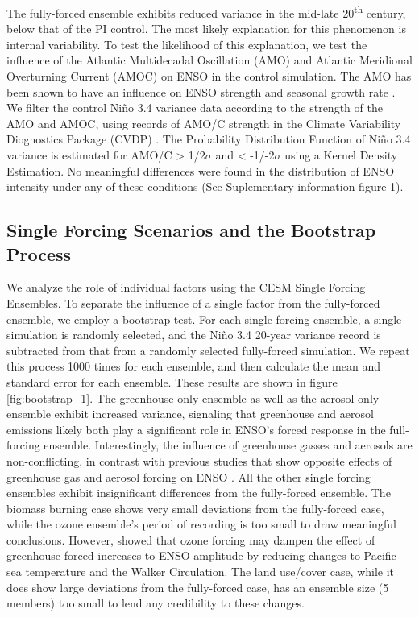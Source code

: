 \documentclass[11pt]{article}
\begin{document}
The fully-forced ensemble exhibits reduced variance in the mid-late 20\textsuperscript{th} century, below that of the PI control. The most likely explanation for this phenomenon is internal variability. To test the likelihood of this explanation, we test the influence of the Atlantic Multidecadal Oscillation (AMO) and Atlantic Meridional Overturning Current (AMOC) on ENSO in the control simulation. The AMO has been shown to have an influence on ENSO strength and seasonal growth rate \citep{levine2017impact}. We filter the control Niño 3.4 variance data according to the strength of the AMO and AMOC, using records of AMO/C strength in the Climate Variability Diognostics Package (CVDP) \citep{phillips2014evaluating}. The Probability Distribution Function of Niño 3.4 variance is estimated for AMO/C > 1/2\(\sigma\) and < -1/-2\(\sigma\) using a Kernel Density Estimation. No meaningful differences were found in the distribution of ENSO intensity under any of these conditions (See Suplementary information figure 1).

\subsection{Single Forcing Scenarios and the Bootstrap Process}
\label{sec:orgec2797d}
We analyze the role of individual factors using the CESM Single Forcing Ensembles. To separate the influence of a single factor from the fully-forced ensemble, we employ a bootstrap test. For each single-forcing ensemble, a single simulation is randomly selected, and the Niño 3.4 20-year variance record is subtracted from that from a randomly selected fully-forced simulation. We repeat this process 1000 times for each ensemble, and then calculate the mean and standard error for each ensemble. These results are shown in figure \ref{fig:bootstrap_1}. The greenhouse-only ensemble as well as the aerosol-only ensemble exhibit increased variance, signaling that greenhouse and aerosol emissions likely both play a significant role in ENSO's forced response in the full-forcing ensemble. Interestingly, the influence of greenhouse gasses and aerosols are non-conflicting, in contrast with previous studies that show opposite effects of greenhouse gas and aerosol forcing on ENSO \citep{stevenson2017forced}. All the other single forcing ensembles exhibit insignificant differences from the fully-forced ensemble. The biomass burning case shows very small deviations from the fully-forced case, while the ozone ensemble's period of recording is too small to draw meaningful conclusions. However, \citet{nowack2017role} showed that ozone forcing may dampen the effect of greenhouse-forced increases to ENSO amplitude by reducing changes to Pacific sea temperature and the Walker Circulation. The land use/cover case, while it does show large deviations from the fully-forced case, has an ensemble size (5 members) too small to lend any credibility to these changes.
\end{document}
